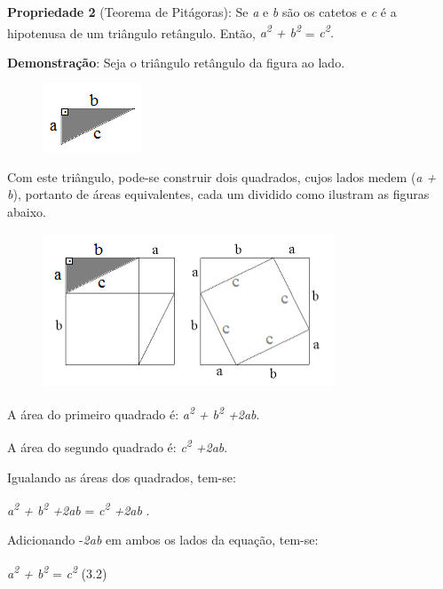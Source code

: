 \begin{caixa}
\textbf{Propriedade 2} (Teorema de Pitágoras): Se  \textit{a }e\textit{ b} são os catetos e \textit{c} é a hipotenusa de um triângulo retângulo. Então, \textit{a\textsuperscript{2} + b\textsuperscript{2} }= \textit{ c\textsuperscript{2}.}

\begin{multicols}{2}

\textbf{Demonstração}: Seja o triângulo retângulo da figura ao lado.

\begin{figure}[H]
    \begin{Center}
        \includegraphics[width=1.17in,height=0.8in]{capitulos/trigonometria_e_funcoes_trigonometricas/media/image12.png}
    \end{Center}
\end{figure}

\end{multicols}

Com este triângulo, pode-se construir dois quadrados, cujos lados medem (\textit{a + b}), portanto de áreas equivalentes, cada um dividido como ilustram as figuras abaixo.

\begin{figure}[H]
    \begin{Center}
        \includegraphics[width=3.43in,height=1.79in]{capitulos/trigonometria_e_funcoes_trigonometricas/media/image13.png}
    \end{Center}
\end{figure}

A área do primeiro quadrado é:  \tab \textit{ a\textsuperscript{2} + b\textsuperscript{2} +2ab}.

A área do segundo quadrado é: \tab \textit{ c\textsuperscript{2} +2ab}.

Igualando as áreas dos quadrados, tem-se:

\textit{a\textsuperscript{2} + b\textsuperscript{2} +2ab} = \textit{ c\textsuperscript{2} +2ab}  .

Adicionando -\textit{2ab}  em ambos os lados da equação, tem-se:

\textit{a\textsuperscript{2} + b\textsuperscript{2} }= \textit{ c\textsuperscript{2}  \qedsymbol{}} \tab (3.2)
\end{caixa}

